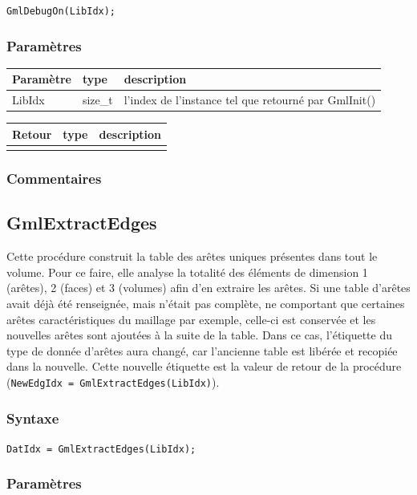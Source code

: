 \documentclass[a4paper,12pt]{article}
\begin{document}
{\tt GmlDebugOn(LibIdx);}

\subsubsection*{Paramètres}

\begin{tabular}{|m{2cm}|m{1.5cm}|m{10.5cm}|}
\hline
Paramètre  & type    & description \\
\hline
LibIdx     & size\_t & l'index de l'instance tel que retourné par GmlInit() \\
\hline
\end{tabular}

\medskip

\begin{tabular}{|m{2cm}|m{1.5cm}|m{10.5cm}|}
\hline
Retour     & type   & description \\
\hline
 & & \\
\hline
\end{tabular}

\subsubsection*{Commentaires}


\subsection{GmlExtractEdges}
Cette procédure construit la table des arêtes uniques présentes dans tout le volume.
Pour ce faire, elle analyse la totalité des éléments de dimension 1 (arêtes), 2 (faces) et 3 (volumes) afin d'en extraire les arêtes.
Si une table d'arêtes avait déjà été renseignée, mais n'était pas complète, ne comportant que certaines arêtes caractéristiques du maillage par exemple, celle-ci est conservée et les nouvelles arêtes sont ajoutées à la suite de la table. Dans ce cas, l'étiquette du type de donnée d'arêtes aura changé, car l'ancienne table est libérée et recopiée dans la nouvelle. Cette nouvelle étiquette est la valeur de retour de la procédure ({\tt NewEdgIdx = GmlExtractEdges(LibIdx)}).

\subsubsection*{Syntaxe}

{\tt DatIdx = GmlExtractEdges(LibIdx);}

\subsubsection*{Paramètres}
\end{document}

